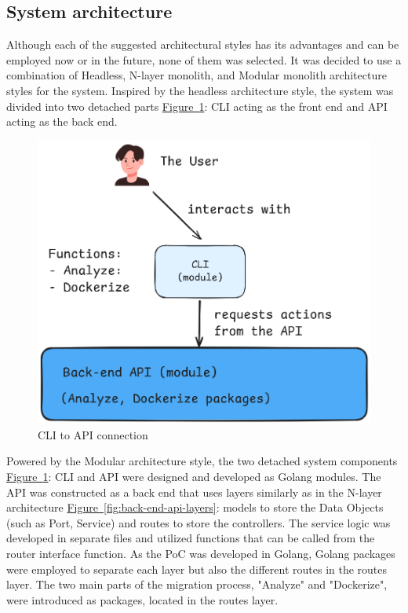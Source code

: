 \documentclass[twocolumn]{article}
\newcommand{\FigRef}[1]{\hyperref[#1]{Figure~\ref{#1}}}
\begin{document}
\subsection{System architecture}
Although each of the suggested architectural styles has its advantages and can be employed now or in the future, none of them was selected. It was decided to use a combination of Headless, N-layer monolith, and Modular monolith architecture styles for the system. Inspired by the headless architecture style, the system was divided into two detached parts \FigRef{fig:cli-api-conn}: CLI acting as the front end and API acting as the back end. 

\begin{figure}[H]
    \centering
    \includegraphics[width=\linewidth]{images/cli-api-connection.png}
    \caption{CLI to API connection}
    \label{fig:cli-api-conn}
\end{figure}

Powered by the Modular architecture style, the two detached system components \FigRef{fig:cli-api-conn}: CLI and API were designed and developed as Golang modules. The API was constructed as a back end that uses layers similarly as in the N-layer architecture \FigRef{fig:back-end-api-layers}: models to store the Data Objects (such as Port, Service) and routes to store the controllers. The service logic was developed in separate files and utilized functions that can be called from the router interface function. As the PoC was developed in Golang, Golang packages were employed to separate each layer but also the different routes in the routes layer. The two main parts of the migration process, "Analyze" and "Dockerize", were introduced as packages, located in the routes layer.
\end{document}
